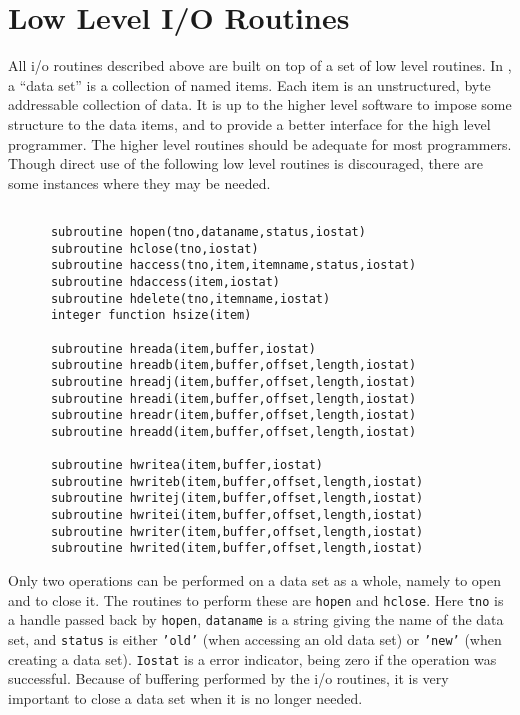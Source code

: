 \documentclass{report}
\begin{document}
\section{Low Level I/O Routines}
All i/o routines described above are built on top of a set of
low level routines. In \miriad, a ``data set'' is a collection of
named items. Each item is an unstructured, byte addressable collection of data.
It is up
to the higher level software to impose some structure to the data items, and
to provide a better interface for the high level programmer.
The higher level routines should be adequate for most
programmers. Though direct use of the following low level routines is
discouraged, there are some instances where they may be needed.
\begin{verbatim}

      subroutine hopen(tno,dataname,status,iostat)
      subroutine hclose(tno,iostat)
      subroutine haccess(tno,item,itemname,status,iostat)
      subroutine hdaccess(item,iostat)
      subroutine hdelete(tno,itemname,iostat)
      integer function hsize(item)

      subroutine hreada(item,buffer,iostat)
      subroutine hreadb(item,buffer,offset,length,iostat)
      subroutine hreadj(item,buffer,offset,length,iostat)
      subroutine hreadi(item,buffer,offset,length,iostat)
      subroutine hreadr(item,buffer,offset,length,iostat)
      subroutine hreadd(item,buffer,offset,length,iostat)

      subroutine hwritea(item,buffer,iostat)
      subroutine hwriteb(item,buffer,offset,length,iostat)
      subroutine hwritej(item,buffer,offset,length,iostat)
      subroutine hwritei(item,buffer,offset,length,iostat)
      subroutine hwriter(item,buffer,offset,length,iostat)
      subroutine hwrited(item,buffer,offset,length,iostat)

\end{verbatim}
Only two operations can be performed on a data set as a whole, namely to
open and to close it. The routines to perform these are
{\tt hopen} and {\tt hclose}. Here {\tt tno} is a handle passed back
by {\tt hopen}, {\tt dataname} is a string giving the name of the data set,
and {\tt status} is either {\tt 'old'} (when accessing an old data set)
or {\tt 'new'} (when creating a data set). {\tt Iostat} is a error
indicator, being zero if the operation was successful. Because of
buffering performed by the i/o routines, it is very
important to close a data set when it is no longer needed.
\end{document}
